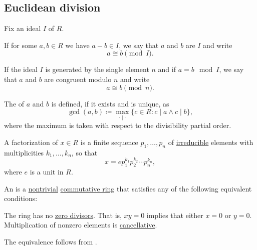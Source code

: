 \subsection{Euclidean division}\label{subsec:euclidean_division}

\begin{definition}\label{def:modulo}
  Fix an ideal \( I \) of \( R \).

  If for some \( a, b \in R \) we have \( a - b \in I \), we say that \( a \) and \( b \) are  \( I \) and write
  \begin{equation*}
    a \cong b \pmod I.
  \end{equation*}

  If the ideal \( I \) is generated by the single element \( n \) and if \( a = b \mod I \), we say that \( a \) and \( b \) are congruent modulo \( n \) and write
  \begin{equation*}
    a \cong b \pmod n.
  \end{equation*}
\end{definition}

\begin{definition}\label{def:greatest_common_denominator}
  The   of \( a \) and \( b \) is defined, if it exists and is unique, as
  \begin{equation*}
    \gcd(a, b) \coloneqq \max_{\cdot \mid \cdot} \{ c \in R : c \mid a \wedge c \mid b \},
  \end{equation*}
  where the maximum is taken with respect to the divisibility partial order.
\end{definition}

\begin{definition}\label{def:factorization_in_ring}
  A factorization of \( x \in R \) is a finite sequence \( p_1, \ldots, p_n \) of \hyperref[def:irreducible_ring_element]{irreducible} elements with multiplicities \( k_1, \ldots, k_n \), so that
  \begin{equation*}
    x = e p_1^{k_1} p_2^{k_2} \cdots p_n^{k_n},
  \end{equation*}
  where \( e \) is a unit in \( R \).
\end{definition}

\begin{definition}\label{def:integral_domain}
  An  is a \hyperref[def:ring/trivial]{nontrivial} \hyperref[def:ring/commutative]{commutative ring} that satisfies any of the following equivalent conditions:
  \begin{thmenum}
     The ring has no \hyperref[def:semiring_division]{zero divisors}. That is, \( xy = 0 \) implies that either \( x = 0 \) or \( y = 0 \).
     Multiplication of nonzero elements is \hyperref[def:magma/cancellative]{cancellative}.
  \end{thmenum}
\end{definition}
\begin{defproof}
  The equivalence follows from .
\end{defproof}

